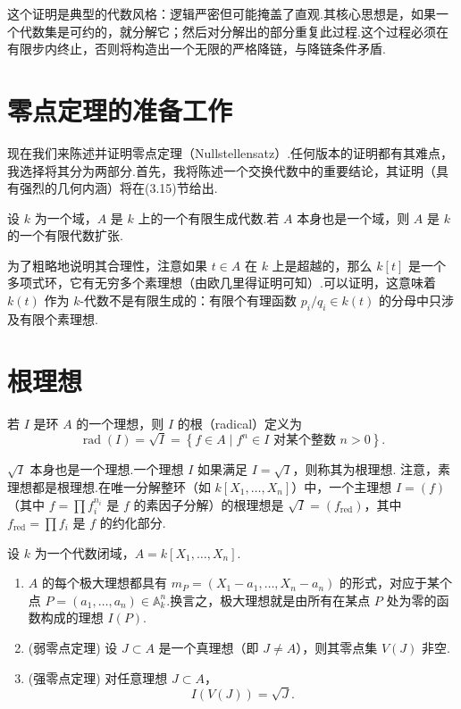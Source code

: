 这个证明是典型的代数风格：逻辑严密但可能掩盖了直观.其核心思想是，如果一个代数集是可约的，就分解它；然后对分解出的部分重复此过程.这个过程必须在有限步内终止，否则将构造出一个无限的严格降链，与降链条件矛盾.

\section{零点定理的准备工作}

现在我们来陈述并证明零点定理（Nullstellensatz）.任何版本的证明都有其难点，我选择将其分为两部分.首先，我将陈述一个交换代数中的重要结论，其证明（具有强烈的几何内涵）将在(3.15)节给出.

\begin{lemma}[Zariski引理]
设 \(k\) 为一个域，\(A\) 是 \(k\) 上的一个有限生成代数.若 \(A\) 本身也是一个域，则 \(A\) 是 \(k\) 的一个有限代数扩张.
\end{lemma}

为了粗略地说明其合理性，注意如果 \(t \in  A\) 在 \(k\) 上是超越的，那么 \(k\left\lbrack  t\right\rbrack\) 是一个多项式环，它有无穷多个素理想（由欧几里得证明可知）.可以证明，这意味着 \(k(t)\) 作为 \(k\)-代数不是有限生成的：有限个有理函数 \({p}_{i}/{q}_{i} \in  k\left( t\right)\) 的分母中只涉及有限个素理想.

\section{根理想}

\begin{definition}[根理想]
若 \(I\) 是环 \(A\) 的一个理想，则 \(I\) 的根（radical）定义为
\[
\operatorname{rad}(I) = \sqrt{I} = \left\{  {f \in  A \mid  {f}^{n} \in  I \text{ 对某个整数 } n>0}\right\}  .
\]
\end{definition}
\(\sqrt{I}\) 本身也是一个理想.一个理想 \(I\) 如果满足 \(I = \sqrt{I}\)，则称其为根理想.
注意，素理想都是根理想.在唯一分解整环（如 \(k\left\lbrack  {{X}_{1},\ldots ,{X}_{n}}\right\rbrack\)）中，一个主理想 \(I = \left( f\right)\)（其中 \(f = \prod {f}_{i}^{{n}_{i}}\) 是 \(f\) 的素因子分解）的根理想是 \(\sqrt{I} = \left( {f}_{\text{red}}\right)\)，其中 \({f}_{\text{red}} = \prod {f}_{i}\) 是 \(f\) 的约化部分.

\begin{theorem}[希尔伯特零点定理]
设 \(k\) 为一个代数闭域，\(A = k\left\lbrack  {{X}_{1},\ldots ,{X}_{n}}\right\rbrack\).
\begin{enumerate}
    \item[\upshape (a)] \(A\) 的每个极大理想都具有 \({m}_{P} = \left( {{X}_{1} - {a}_{1},\ldots ,{X}_{n} - {a}_{n}}\right)\) 的形式，对应于某个点 \(P = \left( {{a}_{1},\ldots ,{a}_{n}}\right)  \in  {\mathbb{A}}_{k}^{n}\).换言之，极大理想就是由所有在某点 \(P\) 处为零的函数构成的理想 \(I(P)\).
    \item[\upshape (b)] (弱零点定理) 设 \(J \subset  A\) 是一个真理想（即 \(J \neq A\)），则其零点集 \(V\left( J\right)\) 非空.
    \item[\upshape (c)] (强零点定理) 对任意理想 \(J \subset  A\)，
    \[
    I\left( {V\left( J\right) }\right)  = \sqrt{J}.
    \]
\end{enumerate}
\end{theorem}

